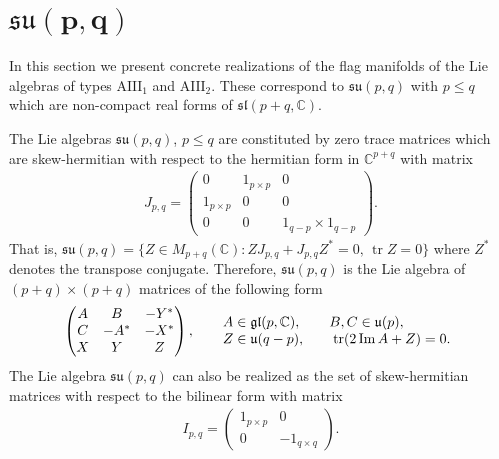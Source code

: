 \documentclass[pdftex]{sigma}
\numberwithin{equation}{section}
\newcommand{\C}{\mathbb C}
\newcommand{\func}[1]{\operatorname{#1}}
\begin{document}
\section[$\mathfrak{su}(p,q)$]{$\boldsymbol{\mathfrak{su}(p,q)}$} \label{secEsseu}

In this section we present concrete realizations of the flag manifolds of the Lie algebras of types $\mathrm{AIII}_{1}$ and $\mathrm{AIII}_{2}$. These correspond to $\mathfrak{su}(p,q)$ with $p\leq q$ which are non-compact real forms of $\mathfrak{sl}(p+q,\C)$.

The Lie algebras $\mathfrak{su}(p,q) $, $p\leq q$ are constituted by zero trace matrices which are skew-hermitian with respect to the hermitian form in $\mathbb{C}^{p+q}$ with matrix
\begin{gather*}
J_{p,q}=\left(
\begin{matrix}
0 & 1_{p\times p} & 0 \\
1_{p\times p} & 0 & 0 \\
0 & 0 & 1_{q-p}\times 1_{q-p}%
\end{matrix}
\right).
\end{gather*}
That is, $\mathfrak{su}(p,q) =\{Z\in M_{p+q} ( \mathbb{C} ) \colon ZJ_{p,q}+J_{p,q}Z^{\ast }=0,\, \operatorname{tr}Z=0\}$ where $Z^{\ast }$ denotes the transpose conjugate. Therefore, $\mathfrak{su}(p,q) $ is the Lie algebra of $(p+q) \times (p+q) $ matrices of the following form
\begin{gather}
\left(
\begin{matrix}
A & B & -Y^{\ast } \\
C & -A^{\ast } & -X^{\ast } \\
X & Y & Z%
\end{matrix}
\right), \qquad
\begin{array}{@{}l}
A\in \mathfrak{gl}(p,\mathbb{C}),\qquad B,C\in \mathfrak{u}(p), \\
Z\in \mathfrak{u}(q-p), \qquad \func{tr}(2\func{Im}A+Z)=0.
\end{array}\label{formatrizes}
\end{gather}
The Lie algebra $\mathfrak{su}(p,q) $ can also be realized as the set of skew-hermitian matrices with respect to the bilinear form with matrix
\begin{gather*}
I_{p,q}=\left(
\begin{matrix}
1_{p\times p} & 0 \\
0 & -1_{q\times q}%
\end{matrix}
\right).
\end{gather*}
\end{document}

